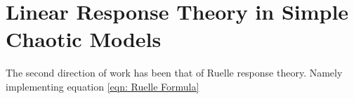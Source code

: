 \section{Linear Response Theory in Simple Chaotic Models} \label{section: LRT}

The second direction of work has been that of Ruelle response theory. Namely implementing equation \ref{eqn: Ruelle Formula}
